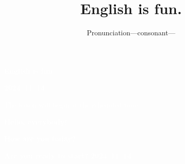 \documentclass[aspectratio=169,xcolor={dvipsnames,table}]{beamer}
\title{English is fun.}
\subtitle{Pronunciation---consonant---}
\author{}
\institute[]{}
\date[]
\begin{document}
\begin{frame}
\raggedleft
  \textcolor{white}{\Huge\bfseries English is fun.}

\vfill

\raggedleft
 \textcolor{white}{\LARGE\bfseries 2024--11--14}

\vfill
\vfill
\vfill

\raggedleft
\textcolor{white}{\large The lesson will begin at the scheduled time.}
\end{frame}
\begin{frame}
\raggedleft
  \textcolor{white}{\Huge\bfseries Hello, everybody!}

\vfill

\raggedleft
 \textcolor{white}{\Huge\bfseries How are you today?}
\vfill

\raggedleft
 \textcolor{white}{\Huge\bfseries Are you ready to start?}
\vfill
\vfill
\vfill
\raggedleft
 \textcolor{white}{\Large\bfseries 2024--11--14}




\hypertarget{top_page}{}
\hyperlink{today}{}
\end{frame}
\end{document}
